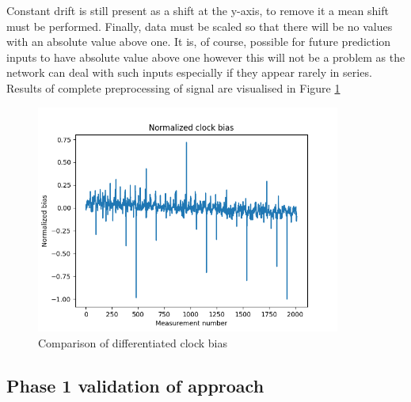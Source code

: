 Constant drift is still present as a shift at the y-axis, to remove it a mean 
shift must be performed.
Finally, data must be scaled so that there will be no values with an absolute value above one.
It is, of course, possible for future prediction inputs to have absolute value above one 
however this will not be a problem as the network can deal with such inputs especially 
if they appear rarely in series.
Results of complete preprocessing of signal are visualised in Figure \ref{fig:bias_normalized}
\begin{figure}[ht] 
	\centering
	\includegraphics[width=10cm]{figures/bias_normalized}
	\caption{Comparison of differentiated clock bias}
	\label{fig:bias_normalized}
\end{figure}
\subsection{Phase 1 validation of approach}

